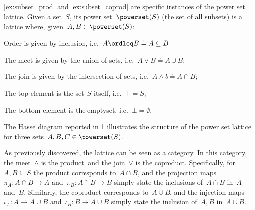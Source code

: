 \subsection{}
\cref{ex:subset_prod} and \cref{ex:subset_coprod} are specific instances of the power set lattice. Given a set~$S$, its power set~$\powerset(S)$ (the set of all subsets) is a lattice where, given~$A,B\in \powerset(S)$:
\begin{compactitem}
\item Order is given by inclusion, i.e.~$A\ordleq B \doteq A\subseteq B$;
\item The meet is given by the union of sets, i.e.~$A\vee B \doteq A\cup B$;
\item The join is given by the intersection of sets, i.e.~$A\wedge b \doteq A\cap B$;
\item The top element is the set~$S$ itself, i.e.~$\top = S$;
\item The bottom element is the emptyset, i.e.~$\bot = \emptyset$.
\end{compactitem}
The Hasse diagram reported in \cref{fig:prod_coprod_power} illustrates the structure of the power set lattice for three sets~$A,B,C\in \powerset(S)$.

\begin{figure}[h]
\begin{center}
\end{center}
\caption{\label{fig:prod_coprod_power}}
\end{figure}
As previously discovered, the lattice can be seen as a category. In this category, the meet~$\wedge$ is the product, and the join~$\vee$ is the coproduct. Specifically, for~$A,B\subseteq S$ the product corresponds to~$A\cap B$, and the projection maps~$\pi_A\colon A\cap B\to A$ and~$\pi_B\colon A\cap B\to B$ simply state the inclusions of~$A\cap B$ in~$A$ and~$B$. Similarly, the coproduct corresponds to~$A\cup B$, and the injection maps~$\iota_A\colon A\to A\cup B$ and~$\iota_B\colon B\to A\cup B$ simply state the inclusion of~$A,B$ in~$A\cup B$.

\subsubsection{}

